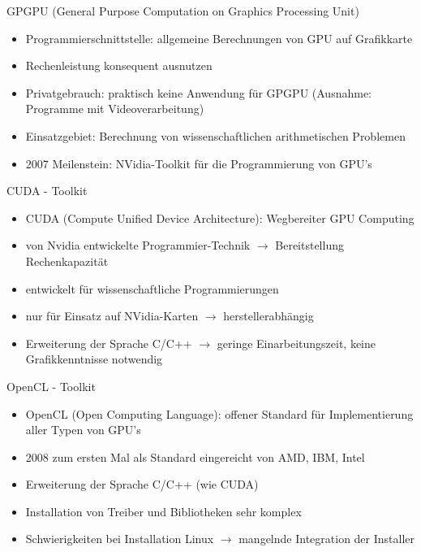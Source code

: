 \documentclass[10pt,aspectratio=169]{beamer}
\begin{document}
\begin{frame}{GPGPU (General Purpose Computation on Graphics Processing Unit)}
    \begin{itemize}

\item Programmierschnittstelle: allgemeine Berechnungen von GPU auf Grafikkarte
\item Rechenleistung konsequent ausnutzen
\item Privatgebrauch: praktisch keine Anwendung für GPGPU (Ausnahme: Programme mit Videoverarbeitung)
\item Einsatzgebiet: Berechnung von wissenschaftlichen arithmetischen Problemen
\item 2007 Meilenstein: NVidia-Toolkit für die Programmierung von GPU's
  
\end{itemize}
\end{frame}


\begin{frame}{CUDA  - Toolkit}
    \begin{itemize}
       \item CUDA (Compute Unified Device Architecture): Wegbereiter GPU Computing
       \item von Nvidia entwickelte Programmier-Technik $ \rightarrow $ Bereitstellung Rechenkapazität
       \item entwickelt für wissenschaftliche Programmierungen
        \item nur für Einsatz auf NVidia-Karten $ \rightarrow $ herstellerabhängig
        \item Erweiterung der Sprache C/C++ $ \rightarrow $ geringe Einarbeitungszeit, keine Grafikkenntnisse notwendig
      


    \end{itemize}
\end{frame}

\begin{frame}{OpenCL - Toolkit}
    \begin{itemize}
\item OpenCL (Open Computing Language): offener Standard für Implementierung aller Typen von GPU's
\item 2008 zum ersten Mal als Standard eingereicht von AMD, IBM, Intel
\item Erweiterung der Sprache C/C++ (wie CUDA)
\item Installation von Treiber und Bibliotheken sehr komplex
\item Schwierigkeiten bei Installation Linux $ \rightarrow $ mangelnde Integration der Installer


    \end{itemize}
\end{frame}
\end{document}

